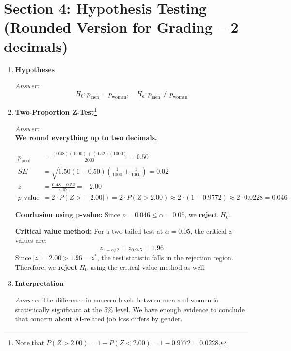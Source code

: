 \documentclass[12pt]{article}
\begin{document}
\newpage 
\section*{Section 4: Hypothesis Testing (Rounded Version for Grading -- 2 decimals)}

\begin{enumerate}[label=4.\arabic*]
    \item \textbf{Hypotheses}

    \textit{Answer:}  
\[
    H_0: p_{\text{men}} = p_{\text{women}}, \quad H_a: p_{\text{men}} \neq p_{\text{women}}
\]

    \item \textbf{Two-Proportion Z-Test}\text{ }\footnote{Note that $P(Z > 2.00) = 1 - P(Z < 2.00) = 1-0.9772 = 0.0228$.}

    \textit{Answer:} \\
    \textbf{We round everything up to two decimals.}

    \begin{align*}
    p_{\text{pool}} &= \frac{(0.48)(1000) + (0.52)(1000)}{2000} = \boxed{0.50} \\
    SE &= \sqrt{0.50(1 - 0.50)\left(\frac{1}{1000} + \frac{1}{1000}\right)} = \boxed{0.02} \\
    z &= \frac{0.48 - 0.52}{0.02} = \boxed{-2.00} \\
    p\text{-value} &= 2 \cdot P(Z > |{-2.00}|) = 2 \cdot P(Z > 2.00) \approx 2\cdot (1-0.9772) \approx 2 \cdot 0.0228 = \boxed{0.046} 
    \end{align*}

    \textbf{Conclusion using p-value:} Since $p = 0.046 \leq \alpha = 0.05$, we \textbf{reject} $H_0$.

    \textbf{Critical value method:} For a two-tailed test at $\alpha = 0.05$, the critical z-values are:
\[
    z_{1-\alpha/2} = z_{0.975} = \boxed{1.96}
\]
    Since $\left| z \right| = 2.00 > 1.96 =z^*$, the test statistic falls in the rejection region. Therefore, we \textbf{reject} $H_0$ using the critical value method as well.
    
    \item \textbf{Interpretation}

    \textit{Answer:} The difference in concern levels between men and women is statistically significant at the 5\% level. We have enough evidence to conclude that concern about AI-related job loss differs by gender.
\end{enumerate}


\newpage 
\end{document}
